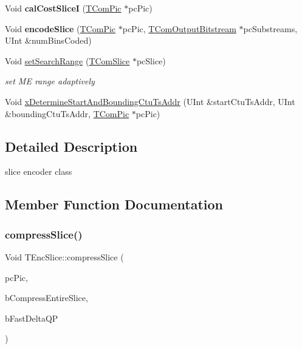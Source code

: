\begin{DoxyCompactItemize}
\mbox{\label{class_t_enc_slice_a83543f39dc671e6ed53ab20f2ecab383}} 
Void {\bfseries cal\+Cost\+SliceI} (\hyperlink{class_t_com_pic}{T\+Com\+Pic} $\ast$pc\+Pic)
\item 
\mbox{\label{class_t_enc_slice_a6a775fc893bbe6040004b072a4ef65bc}} 
Void {\bfseries encode\+Slice} (\hyperlink{class_t_com_pic}{T\+Com\+Pic} $\ast$pc\+Pic, \hyperlink{class_t_com_output_bitstream}{T\+Com\+Output\+Bitstream} $\ast$pc\+Substreams, U\+Int \&num\+Bins\+Coded)
\item 
Void \hyperlink{class_t_enc_slice_a40b64c2ccca74997abde6c6049158b13}{set\+Search\+Range} (\hyperlink{class_t_com_slice}{T\+Com\+Slice} $\ast$pc\+Slice)
\begin{DoxyCompactList}\small\item\em set ME range adaptively \end{DoxyCompactList}\item 
Void \hyperlink{class_t_enc_slice_aa0d1a1bbc6f94db1bd7f5bd13e1a7c82}{x\+Determine\+Start\+And\+Bounding\+Ctu\+Ts\+Addr} (U\+Int \&start\+Ctu\+Ts\+Addr, U\+Int \&bounding\+Ctu\+Ts\+Addr, \hyperlink{class_t_com_pic}{T\+Com\+Pic} $\ast$pc\+Pic)
\end{DoxyCompactItemize}


\subsection{Detailed Description}
slice encoder class 

\subsection{Member Function Documentation}
\mbox{\label{class_t_enc_slice_ae2a0de7e3f92ebb669fd50116bf1bbf6}} 
\subsubsection{\texorpdfstring{compress\+Slice()}{compressSlice()}}
{\footnotesize\ttfamily Void T\+Enc\+Slice\+::compress\+Slice (\begin{DoxyParamCaption}\item[{\hyperlink{class_t_com_pic}{T\+Com\+Pic} $\ast$}]{pc\+Pic,  }\item[{const Bool}]{b\+Compress\+Entire\+Slice,  }\item[{const Bool}]{b\+Fast\+Delta\+QP }\end{DoxyParamCaption})}



